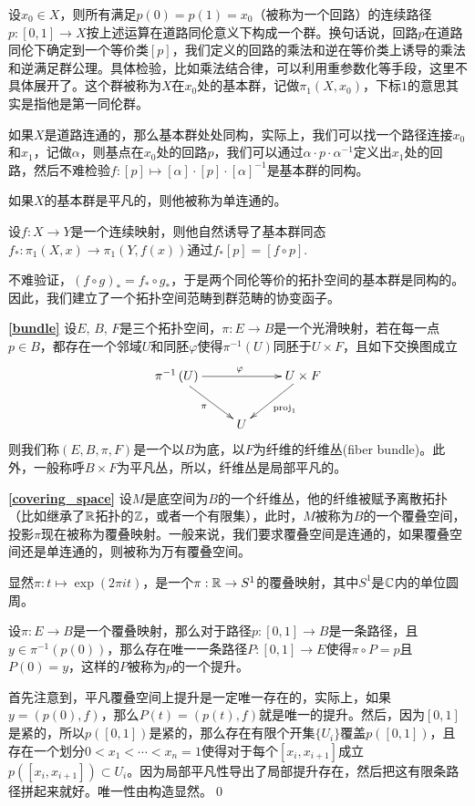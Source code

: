 \para 设$x_0\in X$，则所有满足$p(0)=p(1)=x_0$（被称为一个{\kaishu 回路}）的连续路径$p:[0,1]\to X$按上述运算在道路同伦意义下构成一个群。换句话说，回路$p$在道路同伦下确定到一个等价类$[p]$，我们定义的回路的乘法和逆在等价类上诱导的乘法和逆满足群公理。具体检验，比如乘法结合律，可以利用重参数化等手段，这里不具体展开了。这个群被称为$X$在$x_0$处的{\kaishu 基本群}，记做$\pi_1(X,x_0)$，下标$1$的意思其实是指他是第一同伦群。

如果$X$是道路连通的，那么基本群处处同构，实际上，我们可以找一个路径连接$x_0$和$x_1$，记做$\alpha$，则基点在$x_0$处的回路$p$，我们可以通过$\alpha \cdot p \cdot \alpha^{-1}$定义出$x_1$处的回路，然后不难检验$f:[p]\mapsto [\alpha] \cdot [p] \cdot [\alpha]^{-1}$是基本群的同构。

如果$X$的基本群是平凡的，则他被称为{\kaishu 单连通}的。

\para 设$f:X\to Y$是一个连续映射，则他自然诱导了基本群同态$f_*:\pi_1(X,x)\to \pi_1(Y,f(x))$通过$f_*[p]=[f\circ p]$.

不难验证，$(f\circ g)_*=f_*\circ g_*$，于是两个同伦等价的拓扑空间的基本群是同构的。因此，我们建立了一个拓扑空间范畴到群范畴的协变函子。

\textbf{\eqref{bundle}} 设$E$, $B$, $F$是三个拓扑空间，$\pi:E\to B$是一个光滑映射，若在每一点$p\in B$，都存在一个邻域$U$和同胚$\varphi$使得$\pi^{-1}(U)$同胚于$U \times F$，且如下交换图成立
\[
	\xymatrix{
		\pi^{-1}\left(U\right)\ar[rr]^\varphi \ar[dr]_\pi&&U\times F \ar[dl]^{\mathrm{proj}_1}\\
		&U&
		}
\]
则我们称$(E, B, \pi, F)$是一个以$B$为底，以$F$为纤维的纤维丛(fiber bundle)。此外，一般称呼$B\times F$为平凡丛，所以，纤维丛是局部平凡的。

\textbf{\eqref{covering_space}} 设$M$是底空间为$B$的一个纤维丛，他的纤维被赋予离散拓扑（比如继承了$\mathbb{R}$拓扑的$\mathbb{Z}$，或者一个有限集），此时，$M$被称为$B$的一个覆叠空间，投影$\pi$现在被称为覆叠映射。一般来说，我们要求覆叠空间是连通的，如果覆叠空间还是单连通的，则被称为万有覆叠空间。

显然$\pi:t\mapsto \exp(2\pi it)$，是一个$\pi:\mathbb{R} \to S^1$的覆叠映射，其中$S^1$是$\mathbb{C}$内的单位圆周。

\pro 设$\pi:E\to B$是一个覆叠映射，那么对于路径$p:[0,1]\to B$是一条路径，且$y\in \pi^{-1}(p(0))$，那么存在唯一一条路径$P:[0,1]\to E$使得$\pi\circ P=p$且$P(0)=y$，这样的$P$被称为$p$的一个提升。

\proof 首先注意到，平凡覆叠空间上提升是一定唯一存在的，实际上，如果$y=(p(0),f)$，那么$P(t)=(p(t),f)$就是唯一的提升。然后，因为$[0,1]$是紧的，所以$p([0,1])$是紧的，那么存在有限个开集$\{U_i\}$覆盖$p([0,1])$，且存在一个划分$0<x_1<\cdots<x_n=1$使得对于每个$[x_i,x_{i+1}]$成立$p([x_i,x_{i+1}])\subset U_i$。因为局部平凡性导出了局部提升存在，然后把这有限条路径拼起来就好。唯一性由构造显然。\qed

